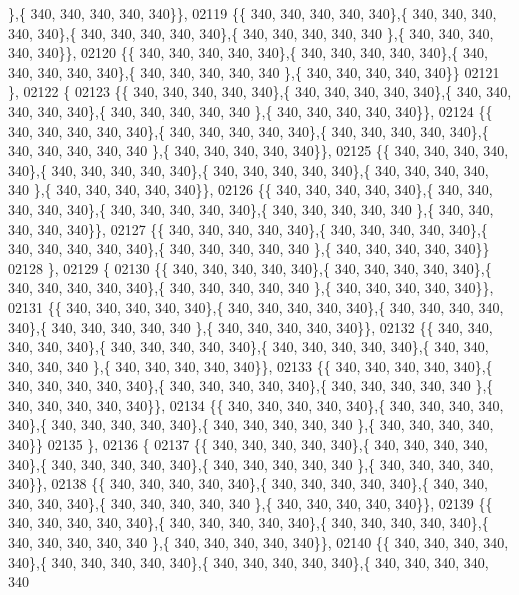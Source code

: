 \begin{DoxyCode}
      \},\{ 340, 340, 340, 340, 340\}\},
02119 \{\{ 340, 340, 340, 340, 340\},\{ 340, 340, 340, 340, 340\},\{ 340, 340, 340, 340, 340\},\{ 340, 340, 340, 340, 340
      \},\{ 340, 340, 340, 340, 340\}\},
02120 \{\{ 340, 340, 340, 340, 340\},\{ 340, 340, 340, 340, 340\},\{ 340, 340, 340, 340, 340\},\{ 340, 340, 340, 340, 340
      \},\{ 340, 340, 340, 340, 340\}\}
02121 \},
02122 \{
02123 \{\{ 340, 340, 340, 340, 340\},\{ 340, 340, 340, 340, 340\},\{ 340, 340, 340, 340, 340\},\{ 340, 340, 340, 340, 340
      \},\{ 340, 340, 340, 340, 340\}\},
02124 \{\{ 340, 340, 340, 340, 340\},\{ 340, 340, 340, 340, 340\},\{ 340, 340, 340, 340, 340\},\{ 340, 340, 340, 340, 340
      \},\{ 340, 340, 340, 340, 340\}\},
02125 \{\{ 340, 340, 340, 340, 340\},\{ 340, 340, 340, 340, 340\},\{ 340, 340, 340, 340, 340\},\{ 340, 340, 340, 340, 340
      \},\{ 340, 340, 340, 340, 340\}\},
02126 \{\{ 340, 340, 340, 340, 340\},\{ 340, 340, 340, 340, 340\},\{ 340, 340, 340, 340, 340\},\{ 340, 340, 340, 340, 340
      \},\{ 340, 340, 340, 340, 340\}\},
02127 \{\{ 340, 340, 340, 340, 340\},\{ 340, 340, 340, 340, 340\},\{ 340, 340, 340, 340, 340\},\{ 340, 340, 340, 340, 340
      \},\{ 340, 340, 340, 340, 340\}\}
02128 \},
02129 \{
02130 \{\{ 340, 340, 340, 340, 340\},\{ 340, 340, 340, 340, 340\},\{ 340, 340, 340, 340, 340\},\{ 340, 340, 340, 340, 340
      \},\{ 340, 340, 340, 340, 340\}\},
02131 \{\{ 340, 340, 340, 340, 340\},\{ 340, 340, 340, 340, 340\},\{ 340, 340, 340, 340, 340\},\{ 340, 340, 340, 340, 340
      \},\{ 340, 340, 340, 340, 340\}\},
02132 \{\{ 340, 340, 340, 340, 340\},\{ 340, 340, 340, 340, 340\},\{ 340, 340, 340, 340, 340\},\{ 340, 340, 340, 340, 340
      \},\{ 340, 340, 340, 340, 340\}\},
02133 \{\{ 340, 340, 340, 340, 340\},\{ 340, 340, 340, 340, 340\},\{ 340, 340, 340, 340, 340\},\{ 340, 340, 340, 340, 340
      \},\{ 340, 340, 340, 340, 340\}\},
02134 \{\{ 340, 340, 340, 340, 340\},\{ 340, 340, 340, 340, 340\},\{ 340, 340, 340, 340, 340\},\{ 340, 340, 340, 340, 340
      \},\{ 340, 340, 340, 340, 340\}\}
02135 \},
02136 \{
02137 \{\{ 340, 340, 340, 340, 340\},\{ 340, 340, 340, 340, 340\},\{ 340, 340, 340, 340, 340\},\{ 340, 340, 340, 340, 340
      \},\{ 340, 340, 340, 340, 340\}\},
02138 \{\{ 340, 340, 340, 340, 340\},\{ 340, 340, 340, 340, 340\},\{ 340, 340, 340, 340, 340\},\{ 340, 340, 340, 340, 340
      \},\{ 340, 340, 340, 340, 340\}\},
02139 \{\{ 340, 340, 340, 340, 340\},\{ 340, 340, 340, 340, 340\},\{ 340, 340, 340, 340, 340\},\{ 340, 340, 340, 340, 340
      \},\{ 340, 340, 340, 340, 340\}\},
02140 \{\{ 340, 340, 340, 340, 340\},\{ 340, 340, 340, 340, 340\},\{ 340, 340, 340, 340, 340\},\{ 340, 340, 340, 340, 340

\end{DoxyCode}
